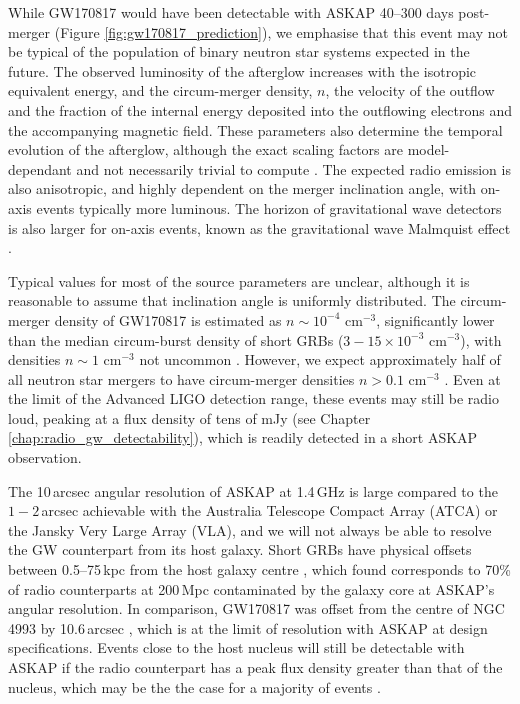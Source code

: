 While GW170817 would have been detectable with ASKAP 40--300 days post-merger (Figure \ref{fig:gw170817_prediction}), we emphasise that this event may not be typical of the population of binary neutron star systems expected in the future. The observed luminosity of the afterglow increases with the isotropic equivalent energy, and the circum-merger density, $n$, the velocity of the outflow and the fraction of the internal energy deposited into the outflowing electrons and the accompanying magnetic field. These parameters also determine the temporal evolution of the afterglow, although the exact scaling factors are model-dependant and not necessarily trivial to compute \citep[e.g.][]{1998ApJ...497L..17S,2011Natur.478...82N,2017MNRAS.471.1652L,2018MNRAS.473..576G,2018MNRAS.481.2581L}. The expected radio emission is also anisotropic, and highly dependent on the merger inclination angle, with on-axis events typically more luminous. The horizon of gravitational wave detectors is also larger for on-axis events, known as the gravitational wave Malmquist effect \citep{2011CQGra..28l5023S}.

Typical values for most of the source parameters are unclear, although it is reasonable to assume that inclination angle is uniformly distributed. The circum-merger density of GW170817 is estimated as $n\sim 10^{-4}$ cm$^{-3}$, significantly lower than the median circum-burst density of short GRBs ($3-15\times 10^{-3}$ cm$^{-3}$), with densities $n\sim 1$ cm$^{-3}$ not uncommon \citep{2015ApJ...815..102F}. However, we expect approximately half of all neutron star mergers to have circum-merger densities $n>0.1$ cm$^{-3}$ \citep{2016ApJ...831..190H}. Even at the limit of the Advanced LIGO detection range, these events may still be radio loud, peaking at a flux density of tens of mJy (see Chapter \ref{chap:radio_gw_detectability}), which is readily detected in a short ASKAP observation.

The 10\,arcsec angular resolution of ASKAP at 1.4\,GHz is large compared to the $1-2$\,arcsec achievable with the Australia Telescope Compact Array (ATCA) or the Jansky Very Large Array (VLA), and we will not always be able to resolve the GW counterpart from its host galaxy. Short GRBs have physical offsets between 0.5--75\,kpc from the host galaxy centre \citep[median 5\,kpc;][]{2014ARA&A..52...43B}, which \citet{2016ApJ...831..190H} found corresponds to 70\% of radio counterparts at 200\,Mpc contaminated by the galaxy core at ASKAP's angular resolution. In comparison, GW170817 was offset from the centre of NGC 4993 by 10.6\,arcsec \citep[or 2 kpc;][]{2017Sci...358.1556C}, which is at the limit of resolution with ASKAP at design specifications. Events close to the host nucleus will still be detectable with ASKAP if the radio counterpart has a peak flux density greater than that of the nucleus, which may be the the case for a majority of events \citep{2016ApJ...831..190H}.

